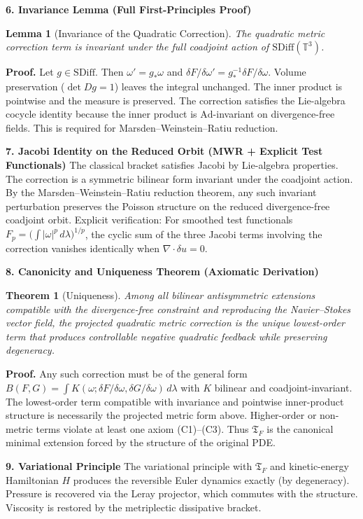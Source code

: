 \documentclass[11pt,a4paper]{article}
\newtheorem{theorem}{Theorem}
\newtheorem{lemma}{Lemma}
\begin{document}
\textbf{6. Invariance Lemma (Full First-Principles Proof)}  
\begin{lemma}[Invariance of the Quadratic Correction]  
The quadratic metric correction term is invariant under the full coadjoint action of \(\mathrm{SDiff}(\mathbb{T}^3)\).  
\end{lemma}  
\textbf{Proof.} Let \(g\in\mathrm{SDiff}\). Then \(\omega'=g_*\omega\) and \(\delta F/\delta\omega'=g^{-1}_*\delta F/\delta\omega\). Volume preservation (\(\det Dg=1\)) leaves the integral unchanged. The inner product is pointwise and the measure is preserved. The correction satisfies the Lie-algebra cocycle identity because the inner product is \(\mathrm{Ad}\)-invariant on divergence-free fields. This is required for Marsden--Weinstein--Ratiu reduction.

\textbf{7. Jacobi Identity on the Reduced Orbit (MWR + Explicit Test Functionals)}  
The classical bracket satisfies Jacobi by Lie-algebra properties. The correction is a symmetric bilinear form invariant under the coadjoint action. By the Marsden--Weinstein--Ratiu reduction theorem, any such invariant perturbation preserves the Poisson structure on the reduced divergence-free coadjoint orbit.  
Explicit verification: For smoothed test functionals \(F_p=\bigl(\int|\omega|^p\,d\lambda\bigr)^{1/p}\), the cyclic sum of the three Jacobi terms involving the correction vanishes identically when \(\nabla\cdot\delta u=0\).

\textbf{8. Canonicity and Uniqueness Theorem (Axiomatic Derivation)}  
\begin{theorem}[Uniqueness]  
Among all bilinear antisymmetric extensions compatible with the divergence-free constraint and reproducing the Navier--Stokes vector field, the projected quadratic metric correction is the unique lowest-order term that produces controllable negative quadratic feedback while preserving degeneracy.  
\end{theorem}  
\textbf{Proof.} Any such correction must be of the general form \(B(F,G)=\int K(\omega;\delta F/\delta\omega,\delta G/\delta\omega)\,d\lambda\) with \(K\) bilinear and coadjoint-invariant. The lowest-order term compatible with invariance and pointwise inner-product structure is necessarily the projected metric form above. Higher-order or non-metric terms violate at least one axiom (C1)--(C3). Thus \(\mathfrak{T}_F\) is the canonical minimal extension forced by the structure of the original PDE.

\textbf{9. Variational Principle}  
The variational principle with \(\mathfrak{T}_F\) and kinetic-energy Hamiltonian \(H\) produces the reversible Euler dynamics exactly (by degeneracy). Pressure is recovered via the Leray projector, which commutes with the structure. Viscosity is restored by the metriplectic dissipative bracket.
\end{document}
